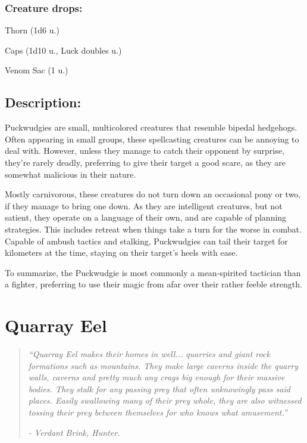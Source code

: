 \documentclass[11pt,a4paper,twocolumn]{book}
\begin{document}
	\subsubsection*{Creature drops:}
	\begin{compactitem}
		\item Thorn (1d6 u.)
		\item Caps (1d10 u., Luck doubles u.)
		\item Venom Sac (1 u.)
	\end{compactitem}
	
	\subsection*{Description:}
	Puckwudgies are small, multicolored creatures that resemble bipedal hedgehogs. Often appearing in small groups, these spellcasting creatures can be annoying to deal with. However, unless they manage to catch their opponent by surprise, they're rarely deadly, preferring to give their target a good scare, as they are somewhat malicious in their nature.
	
	Mostly carnivorous, these creatures do not turn down an occasional pony or two, if they manage to bring one down. As they are intelligent creatures, but not satient, they operate on a language of their own, and are capable of planning strategies. This includes retreat when things take a turn for the worse in combat. Capable of ambush tactics and stalking, Puckwudgies can tail their target for kilometers at the time, staying on their target's heels with ease.
	
	To summarize, the Puckwudgie is most commonly a mean-spirited tactician than a fighter, preferring to use their magic from afar over their rather feeble strength.
	
	\clearpage
	
	\section*{Quarray Eel}
	\begin{quote}
		\emph{``Quarray Eel makes their homes in well... quarries and giant rock formations such as mountains. They make large caverns inside the quarry walls, caverns and pretty much any crags big enough for their massive bodies.  They stalk for any passing prey that often unknowingly pass said places. Easily swallowing many of their prey whole, they are also witnessed tossing their prey between themselves for who knows what amusement.''}
		
		\emph{-	Verdant Brink, Hunter.}
	\end{quote}
	
\end{document}
